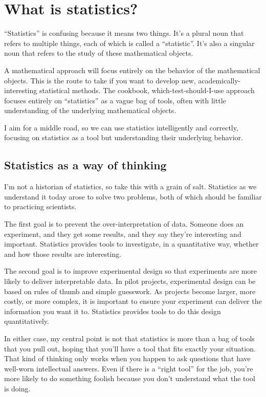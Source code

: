 
\chapter{What is statistics?}

``Statistics'' is confusing because it means two things. It's a plural noun that
refers to multiple things, each of which is called a ``statistic''. It's also a
singular noun that refers to the study of these mathematical objects.

A mathematical approach will focus entirely on the behavior of the
mathematical objects. This is the route to take if you want to develop new, 
academically-interesting statistical methods. The cookbook,
which-test-should-I-use approach focuses entirely on ``statistics'' as a vague
bag of tools, often with little understanding of the underlying mathematical
objects.

I aim for a middle road, so we can use statistics intelligently and correctly,
focusing on statistics as a tool but understanding their underlying behavior.

\section{Statistics as a way of thinking}

I'm not a historian of statistics, so take this with a grain of salt.
Statistics as we understand it today arose to solve two problems, both of which should be familiar to practicing scientists.

The first goal is to prevent the over-interpretation of data. Someone does an experiment, and they get some results, and they say they're interesting and important. Statistics provides tools to investigate, in a quantitative way, whether and how those results are interesting.

The second goal is to improve experimental design so that experiments are more likely to deliver interpretable data. In pilot projects, experimental design can be based on rules of thumb and simple guesswork. As projects become larger, more costly, or more complex, it is important to ensure your experiment can deliver the information you want it to. Statistics provides tools to do this design quantitatively.

In either case, my central point is not that statistics is more than a bag of tools that you pull out, hoping that you'll have a tool that fits exactly your situation. That kind of thinking only works when you happen to ask questions that have well-worn intellectual answers. Even if there is a ``right tool'' for the job, you're more likely to do something foolish because you don't understand what the tool is doing.

